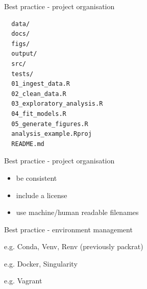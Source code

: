 \documentclass{beamer} %
\begin{document}
  \begin{frame}[fragile]{Best practice - project organisation}
        \small
        \begin{verbatim}
  data/
  docs/
  figs/
  output/
  src/
  tests/
  01_ingest_data.R
  02_clean_data.R
  03_exploratory_analysis.R
  04_fit_models.R
  05_generate_figures.R
  analysis_example.Rproj
  README.md\end{verbatim}
  \end{frame}

  \begin{frame}{Best practice - project organisation}
    \begin{itemize}
      \item be consistent
      \item include a license
      \item use machine/human readable filenames
    \end{itemize}
  \end{frame}


  \begin{frame}{Best practice - environment management}
    \begin{tcolorbox}[skin=beamer,adjusted title=Virtual environments]
      e.g. Conda, Venv, Renv (previously packrat)
    \end{tcolorbox}
    \begin{tcolorbox}[skin=beamer,adjusted title=Containers]
      e.g. Docker, Singularity
    \end{tcolorbox}
    \begin{tcolorbox}[skin=beamer,adjusted title=Virtual Machines]
      e.g. Vagrant
    \end{tcolorbox}    
  \end{frame}
  
\end{document}
